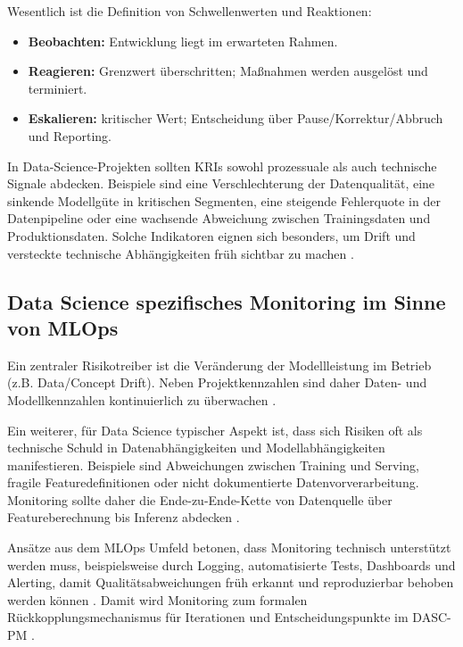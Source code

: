 Wesentlich ist die Definition von Schwellenwerten und Reaktionen:
\begin{itemize}
  \item \textbf{Beobachten:}
				Entwicklung liegt im erwarteten Rahmen.
  \item \textbf{Reagieren:}
				Grenzwert überschritten; Maßnahmen werden ausgelöst und terminiert.
  \item \textbf{Eskalieren:}
				kritischer Wert; Entscheidung über Pause/Korrektur/Abbruch und Reporting.
\end{itemize}

In Data-Science-Projekten sollten KRIs sowohl prozessuale als auch technische Signale abdecken.
Beispiele sind eine Verschlechterung der Datenqualität,
eine sinkende Modellgüte in kritischen Segmenten,
eine steigende Fehlerquote in der Datenpipeline
oder eine wachsende Abweichung zwischen Trainingsdaten und Produktionsdaten.
Solche Indikatoren eignen sich besonders,
um Drift und versteckte technische Abhängigkeiten früh sichtbar zu machen
\cite{Sculley2015}.

\subsection{Data Science spezifisches Monitoring im Sinne von MLOps}
Ein zentraler Risikotreiber ist die Veränderung der Modellleistung im Betrieb (z.B. Data/Concept Drift).
Neben Projektkennzahlen sind daher Daten- und Modellkennzahlen kontinuierlich zu überwachen \cite{Sculley2015,Amershi2019}.

Ein weiterer, für Data Science typischer Aspekt ist,
dass sich Risiken oft als technische Schuld in Datenabhängigkeiten und Modellabhängigkeiten
manifestieren.
Beispiele sind Abweichungen zwischen Training und Serving,
fragile Featuredefinitionen oder nicht dokumentierte Datenvorverarbeitung.
Monitoring sollte daher die Ende-zu-Ende-Kette von Datenquelle über Featureberechnung bis Inferenz abdecken \cite{Sculley2015}.

Ansätze aus dem MLOps Umfeld betonen,
dass Monitoring technisch unterstützt werden muss,
beispielsweise durch Logging, automatisierte Tests, Dashboards und Alerting,
damit Qualitätsabweichungen früh erkannt und reproduzierbar behoben werden können
\cite{Amershi2019}.
Damit wird Monitoring zum formalen Rückkopplungsmechanismus für Iterationen und Entscheidungspunkte im DASC-PM \cite{schulz_dasc-pm_2022}.

